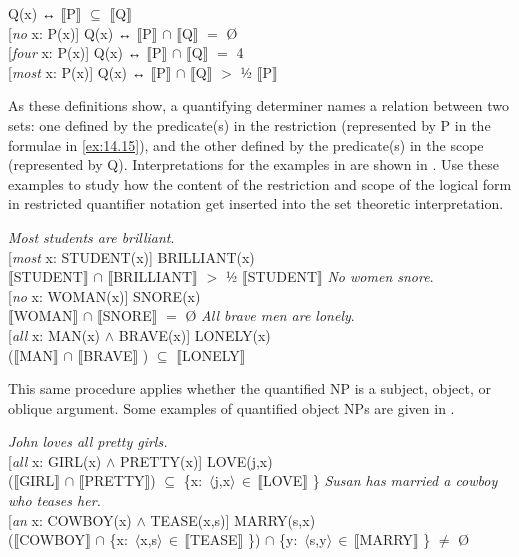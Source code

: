 \ea \label{ex:14.15}
\ea {} Q(x)  ↔   $\llbracket$P$\rrbracket$  ${\subseteq}$ $\llbracket$Q$\rrbracket$ \\
\ex{} [\textit{no} x: P(x)] Q(x)  ↔   $\llbracket$P$\rrbracket$  ${\cap}$ $\llbracket$Q$\rrbracket$  $=$ \O \\
\ex{} [\textit{four} x: P(x)] Q(x)  ↔   {\textbar} $\llbracket$P$\rrbracket$  ${\cap}$ $\llbracket$Q$\rrbracket$  {\textbar}  $=$ 4\\
\ex{} [\textit{most} x: P(x)] Q(x)  ↔   {\textbar} $\llbracket$P$\rrbracket$  ${\cap}$ $\llbracket$Q$\rrbracket$  {\textbar}  $>$  ½ {\textbar} $\llbracket$P$\rrbracket$ {\textbar}
                       \z
\z


As these definitions show, a quantifying determiner names a relation between two sets: one defined by the predicate(s) in the restriction (represented by P in the formulae in \ref{ex:14.15}), and the other defined by the predicate(s) in the scope (represented by Q). Interpretations for the examples in  are shown in . Use these examples to study how the content of the restriction and scope of the logical form in restricted quantifier notation get inserted into the set theoretic interpretation.


\ea \label{ex:14.16}
\ea  \textit{Most students are brilliant}.\\
{}[\textit{most} x: STUDENT(x)] BRILLIANT(x)\\
{\textbar} $\llbracket$STUDENT$\rrbracket$  ${\cap}$ $\llbracket$BRILLIANT$\rrbracket$  {\textbar}  $>$  ½ \textsc{{\textbar}} $\llbracket$STUDENT$\rrbracket$ {\textbar}
\ex \textit{No women snore}.\\
{}[\textit{no} x: WOMAN(x)] SNORE(x)\\
$\llbracket$WOMAN$\rrbracket$  ${\cap}$ $\llbracket$SNORE$\rrbracket$  $=$ \O
\ex   \textit{All brave men are lonely}.\\
{}[\textit{all} x: MAN(x) $\wedge$ BRAVE(x)] LONELY(x)\\
($\llbracket$MAN$\rrbracket$  ${\cap}$ $\llbracket$BRAVE$\rrbracket$ )  ${\subseteq}$ $\llbracket$LONELY$\rrbracket$ 
\z \z


This same procedure applies whether the quantified NP is a subject, object, or oblique argument. Some examples of quantified object NPs are given in .


\ea \label{ex:14.17}
\ea \textit{John loves all pretty girls.}\\
{}[\textit{all} x: GIRL(x) $\wedge$ PRETTY(x)] LOVE(j,x)\\
($\llbracket$GIRL$\rrbracket$  ${\cap}$ $\llbracket$PRETTY$\rrbracket$) ${\subseteq}$ \{x:~$\langle$j,x$\rangle \, {\in} \, \llbracket$LOVE$\rrbracket$ \}
\ex \textit{Susan has married a cowboy who teases her.}\\
{}[\textit{an} x: COWBOY(x) $\wedge$ TEASE(x,s)] MARRY(s,x)\\
($\llbracket$COWBOY$\rrbracket$  ${\cap}$ \{x:~$\langle$x,s$\rangle \, {\in} \, \llbracket$TEASE$\rrbracket$ \}) ${\cap}$ \{y:~$\langle$s,y$\rangle \, {\in} \, \llbracket$MARRY$\rrbracket$ \} $\neq$ \O 
\z \z



